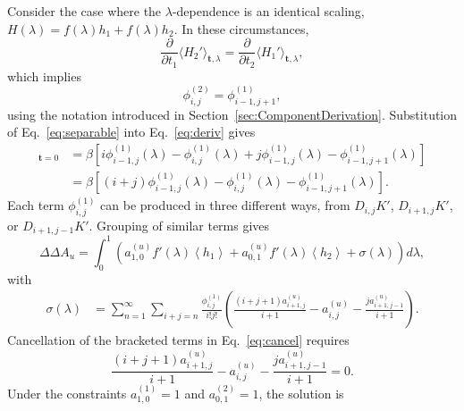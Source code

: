 \documentclass{article}
\let\vec\mathbf
\begin{document}
\begin{appendices}
Consider the case where the $\lambda$-dependence is an identical scaling, $H(\lambda) = f(\lambda)h_1 + f(\lambda)h_2$. In these circumstances,
\begin{equation*}
\frac{\partial}{\partial t_1}
	\langle H_2' \rangle_{\vec t, \lambda} = 
\frac{\partial}{\partial t_2}
	\langle H_1' \rangle_{\vec t, \lambda},
\end{equation*}
which implies
\begin{equation}
\phi_{i,j}^{(2)} = \phi_{i-1,j+1}^{(1)}, 
\label{eq:separable}
\end{equation}
using the notation introduced in Section~\ref{sec:ComponentDerivation}. 
Substitution of Eq.~\ref{eq:separable} into Eq.~\ref{eq:deriv} gives
\begin{align}
[D_{i,j}K_\lambda']_{\vec t=0} &=
	\beta\left[
		i \phi_{i-1, j}^{(1)}(\lambda) -
    	\phi_{i,j}^{(1)}(\lambda) +
    	j \phi_{i-1, j}^{(1)}(\lambda) -
    	\phi_{i-1,j+1}^{(1)}(\lambda)
    \right] \nonumber \\
    &=
	\beta\left[
		(i + j)\phi_{i-1, j}^{(1)}(\lambda) -
    	\phi_{i,j}^{(1)}(\lambda) -
    	\phi_{i-1,j+1}^{(1)}(\lambda)
    \right].
\end{align}
Each term $\phi_{i,j}^{(1)}$ can be produced in three different ways, from $D_{i,j}K'$, $D_{i+1,j}K'$, or $D_{i+1,j-1}K'$. Grouping of similar terms gives
\begin{equation}
\Delta\Delta A_u =
	\int_0^1 \left(
        a_{1,0}^{(u)}f'(\lambda)
        \left\langle h_1 \right\rangle +
        a_{0,1}^{(u)}f'(\lambda)
        \left\langle h_2 \right\rangle +
        \sigma(\lambda)
    \right) d\lambda,
\end{equation}
with
\begin{align}
\sigma(\lambda) &=
	\sum_{n=1}^{\infty}
    \sum_{i+j=n}
        \frac
        	{\phi_{i,j}^{(1)}}
            {i!j!}
        \left(
            \frac
                {(i+j+1)a_{i+1,j}^{(u)}}
                {i+1} -
            a_{i,j}^{(u)} -
           	\frac
            	{j a_{i+1,j-1}^{(u)}}
                {i+1}
		\right).
\label{eq:cancel}
\end{align}
Cancellation of the bracketed terms in Eq.~\ref{eq:cancel} requires
\begin{equation}
\frac
	{(i+j+1)a_{i+1,j}^{(u)}}
	{i+1} -
a_{i,j}^{(u)} -
\frac
	{j a_{i+1,j-1}^{(u)}}
	{i+1}
= 0.
\end{equation}
Under the constraints $a_{1,0}^{(1)} = 1$ and $a_{0,1}^{(2)} = 1$, the solution is
\begin{align}

\end{align}
\end{appendices}
\end{document}
